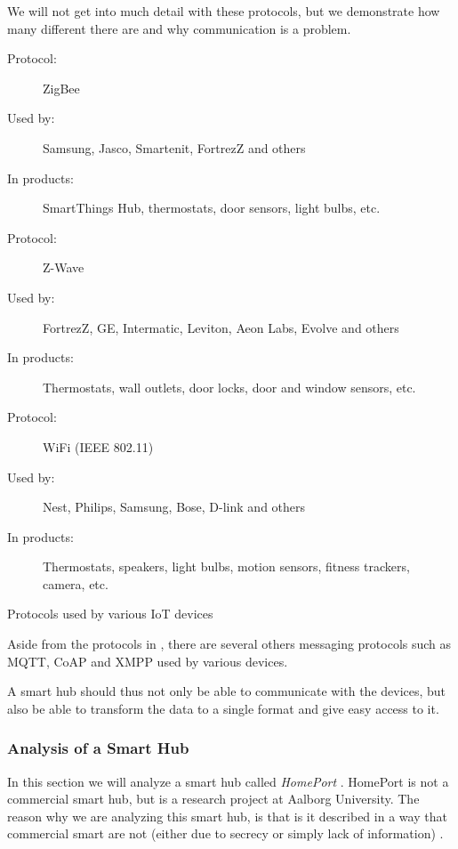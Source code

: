 %    

We will not get into much detail with these protocols, 
but we demonstrate how many different there are and why communication is a problem.
\begin{table}
   \begin{description}
       \item[Protocol:] ZigBee
       \item[Used by:] Samsung, Jasco, Smartenit, FortrezZ and others
       \item[In products:] SmartThings Hub, thermostats, door sensors, light bulbs, etc.\\
       
       \item[Protocol:] Z-Wave
       \item[Used by:] FortrezZ, GE, Intermatic, Leviton, Aeon Labs, Evolve and others
       \item[In products:] Thermostats, wall outlets, door locks, door and window sensors, etc.  \\
       
       \item[Protocol:] WiFi (IEEE 802.11)
       \item[Used by:] Nest, Philips, Samsung, Bose, D-link and others
       \item[In products:] Thermostats, speakers, light bulbs, motion sensors, fitness trackers, camera, etc. 
    \end{description}
    \caption{Protocols used by various IoT devices}\label{table:iotprotocols}
\end{table}

Aside from the protocols in , 
there are several others messaging protocols such as MQTT, CoAP and XMPP used by various devices. 

A smart hub should thus not only be able to communicate with the devices, 
but also be able to transform the data to a single format and give easy access to it.

\subsubsection{Analysis of a Smart Hub}
In this section we will analyze a smart hub called \emph{HomePort} \cite{HOMEPORT10}.
HomePort is not a commercial smart hub, 
but is a research project at Aalborg University. 
The reason why we are analyzing this smart hub, 
is that is it described in a way that commercial smart are not (either due to secrecy or simply lack of information) \cite{HOMEPORT09, HOMEPORT10, HOMEPORT13}.  

